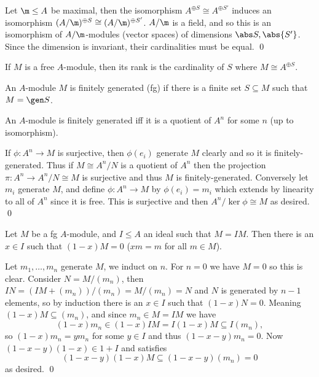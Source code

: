 \eprop

\bproof

    Let $\m\leq A$ be maximal, then the isomorphism $A^{\oplus S}\cong A^{\oplus S'}$ induces an isomorphism
    $(A/\m)^{\oplus S}\cong(A/\m)^{\oplus S'}$.
    $A/\m$ is a field, and so this is an isomorphism of $A/\m$-modules (vector spaces) of dimensions $\abs S,\abs{S'}$.
    Since the dimension is invariant, their cardinalities must be equal.
    \qed

\eproof

\bdefn

    If $M$ is a free $A$-module, then its {\emphcolor rank} is the cardinality of $S$ where $M\cong A^{\oplus S}$.

\edefn

\bdefn

    An $A$-module $M$ is {\emphcolor finitely generated} ({\emphcolor fg}) if there is a finite set $S\subseteq M$ such that $M=\gen S$.

\edefn

\bprop

    An $A$-module is finitely generated iff it is a quotient of $A^n$ for some $n$ (up to isomorphism).

\eprop

\bproof

    If $\phi\colon A^n\to M$ is surjective, then $\phi(e_i)$ generate $M$ clearly and so it is finitely-generated.
    Thus if $M\cong A^n/N$ is a quotient of $A^n$ then the projection $\pi\colon A^n\to A^n/N\cong M$ is surjective and thus $M$
    is finitely-generated.
    Conversely let $m_i$ generate $M$, and define $\phi\colon A^n\to M$ by $\phi(e_i)=m_i$ which extends by linearity to all of $A^n$ since
    it is free.
    This is surjective and then $A^n/\ker\phi\cong M$ as desired.
    \qed

\eproof

\bprop

    Let $M$ be a fg $A$-module, and $I\leq A$ an ideal such that $M=IM$.
    Then there is an $x\in I$ such that $(1-x)M=0$ ($xm=m$ for all $m\in M$).

\eprop

\bproof

    Let $m_1,\dots,m_n$ generate $M$, we induct on $n$.
    For $n=0$ we have $M=0$ so this is clear.
    Consider $N=M/(m_n)$, then $IN=(IM+(m_n))/(m_n)=M/(m_n)=N$ and $N$ is generated by $n-1$ elements, so by induction there is an $x\in I$
    such that $(1-x)N=0$.
    Meaning $(1-x)M\subseteq(m_n)$, and since $m_n\in M=IM$ we have
    $$ (1-x)m_n \in (1-x)IM = I(1-x)M \subseteq I(m_n), $$
    so $(1-x)m_n=ym_n$ for some $y\in I$ and thus $(1-x-y)m_n=0$.
    Now $(1-x-y)(1-x)\in 1+I$ and satisfies
    $$ (1-x-y)(1-x)M \subseteq (1-x-y)(m_n) = 0 $$
    as desired.
    \qed

